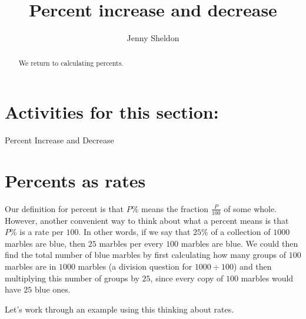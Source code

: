 \documentclass{ximera}
\title{Percent increase and decrease}
\author{Jenny Sheldon}
\begin{document}
\begin{abstract}
We return to calculating percents.
\end{abstract}
\maketitle

\section{Activities for this section:} Percent Increase and Decrease

\section{Percents as rates}

Our definition for percent is that $P\%$ means the fraction $\frac{P}{100}$ of some whole. However, another convenient way to think about what a percent means is that $P\%$ is a rate per $100$. In other words, if we say that $25\%$ of a collection of $1000$ marbles are blue, then $25$ marbles per every $100$ marbles are blue. We could then find the total number of blue marbles by first calculating how many groups of $100$ marbles are in $1000$ marbles (a division question for $1000 \div 100$) and then multiplying this number of groups by $25$, since every copy of $100$ marbles would have $25$ blue ones. 

Let's work through an example using this thinking about rates.
\end{document}
